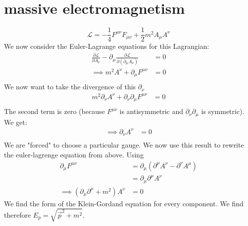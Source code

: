 \documentclass{report}
\begin{document}
\section{massive electromagnetism}
\[
	\mathcal{L} = -\frac{1}{4} F^{\mu \nu} F_{\mu \nu} + \frac{1}{2} m^2 A_\mu A^\nu
\] We now consider the Euler-Lagrange equations for this Lagrangian:
\begin{align*}
	\frac{\partial \mathcal{L}}{\partial A_\nu} - \partial_\mu \frac{\partial \mathcal{L}}{\partial \left( \partial_\mu A_\nu   \right) } &= 0 \\
	\implies m^2 A^\nu + \partial_\mu F^{\mu \nu} &= 0 \\ 
\end{align*} We now want to take the divergence of this $\partial_\nu $ 
\begin{align*}
	m^2 \partial_\nu A^\nu + \partial_\nu \partial_\mu F^{\mu \nu} &= 0 \\ 
\end{align*}
The second term is zero (because $F^{\mu \nu}$ is antisymmetric and $\partial_\nu \partial_\mu $ is symmetric). We get:
\begin{align*}
	\implies \partial_\nu A^\nu &= 0 \\ 
\end{align*}
We are "forced" to choose a particular gauge. We now use this result to rewrite the euler-lagrenge equation from above. Using 
\begin{align*}
	\partial_\mu F^{\mu \nu} &= \partial_\mu \left( \partial^\mu A^\nu - \partial^\nu A^\mu   \right)  \\
	&= \partial_\mu \partial^\mu A^\nu \\
	\implies \left( \partial_\mu \partial^\mu + m^2   \right) A^\nu &= 0
\end{align*}
We find the form of the Klein-Gordand equation for every component. We find therefore $E_p = \sqrt{\vec{p}^2 + m^2} $.\\
\end{document}
